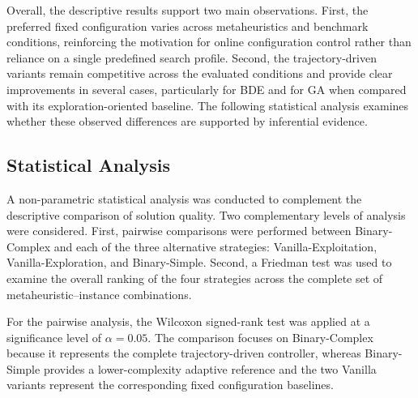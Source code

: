 \documentclass[journal,article,submit,moreauthors]{Definitions/mdpi}
\begin{document}
Overall, the descriptive results support two main observations. First, the
preferred fixed configuration varies across metaheuristics and benchmark
conditions, reinforcing the motivation for online configuration control
rather than reliance on a single predefined search profile. Second, the
trajectory-driven variants remain competitive across the evaluated
conditions and provide clear improvements in several cases, particularly
for BDE and for GA when compared with its exploration-oriented baseline.
The following statistical analysis examines whether these observed
differences are supported by inferential evidence.


\subsection{Statistical Analysis}
\label{subsec:statistical_analysis}

A non-parametric statistical analysis was conducted to complement the
descriptive comparison of solution quality. Two complementary levels of
analysis were considered. First, pairwise comparisons were performed between
Binary-Complex and each of the three alternative strategies:
Vanilla-Exploitation, Vanilla-Exploration, and Binary-Simple. Second, a
Friedman test was used to examine the overall ranking of the four strategies
across the complete set of metaheuristic--instance combinations.

For the pairwise analysis, the Wilcoxon signed-rank test was applied at a
significance level of $\alpha=0.05$. The comparison focuses on
Binary-Complex because it represents the complete trajectory-driven
controller, whereas Binary-Simple provides a lower-complexity adaptive
reference and the two Vanilla variants represent the corresponding fixed
configuration baselines.
\end{document}
